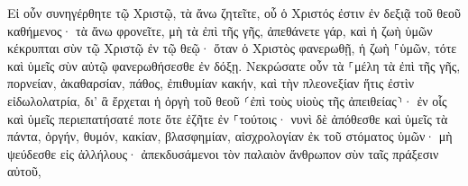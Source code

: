 \documentclass{openreader}
\begin{document}
Εἰ οὖν συνηγέρθητε τῷ Χριστῷ, τὰ ἄνω ζητεῖτε, οὗ ὁ Χριστός ἐστιν ἐν δεξιᾷ τοῦ θεοῦ καθήμενος· 
τὰ ἄνω φρονεῖτε, μὴ τὰ ἐπὶ τῆς γῆς, 
ἀπεθάνετε γάρ, καὶ ἡ ζωὴ ὑμῶν κέκρυπται σὺν τῷ Χριστῷ ἐν τῷ θεῷ· 
ὅταν ὁ Χριστὸς φανερωθῇ, ἡ ζωὴ ⸀ὑμῶν, τότε καὶ ὑμεῖς σὺν αὐτῷ φανερωθήσεσθε ἐν δόξῃ. 
Νεκρώσατε οὖν τὰ ⸀μέλη τὰ ἐπὶ τῆς γῆς, πορνείαν, ἀκαθαρσίαν, πάθος, ἐπιθυμίαν κακήν, καὶ τὴν πλεονεξίαν ἥτις ἐστὶν εἰδωλολατρία, 
δι’ ἃ ἔρχεται ἡ ὀργὴ τοῦ θεοῦ ⸂ἐπὶ τοὺς υἱοὺς τῆς ἀπειθείας⸃· 
ἐν οἷς καὶ ὑμεῖς περιεπατήσατέ ποτε ὅτε ἐζῆτε ἐν ⸀τούτοις· 
νυνὶ δὲ ἀπόθεσθε καὶ ὑμεῖς τὰ πάντα, ὀργήν, θυμόν, κακίαν, βλασφημίαν, αἰσχρολογίαν ἐκ τοῦ στόματος ὑμῶν· 
μὴ ψεύδεσθε εἰς ἀλλήλους· ἀπεκδυσάμενοι τὸν παλαιὸν ἄνθρωπον σὺν ταῖς πράξεσιν αὐτοῦ, 
\end{document}
